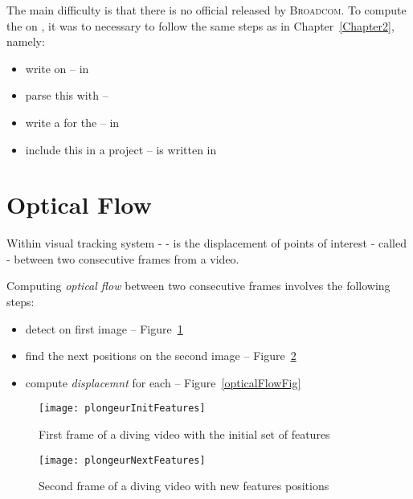 The main difficulty is that there is no official  released by \textsc{Broadcom}. To compute the  on \rasp, it was to necessary to follow the same steps as in Chapter~\ref{Chapter2}, namely:
\begin{itemize}
	\item write  on  -- in 
	\item parse this  with  -- 
	\item write a  for the  -- in 
	\item include this  in a  project --  is written in 
\end{itemize}


\section{Optical Flow}

Within \iBubble{} visual tracking system -  -  is the displacement of points of interest - called  - between two consecutive frames from a video.

Computing \emph{optical flow} between two consecutive frames involves the following steps:
\begin{itemize}
	\item detect  on first image -- Figure~\ref{initFeaturesFig}
	\item find the next  positions on the second image -- Figure~\ref{secondFeaturesFig}
	\item compute \emph{displacemnt} for each  -- Figure~\ref{opticalFlowFig}
\end{itemize}


\begin{figure}[!htbp]
	\centering
	\texttt{[image: plongeurInitFeatures]}
	\caption{First frame of a diving video with the initial set of features}
	\label{initFeaturesFig}
\end{figure}
\FloatBarrier



\begin{figure}[!htbp]
	\centering
	\texttt{[image: plongeurNextFeatures]}
	\caption{Second frame of a diving video with new features positions}
	\label{secondFeaturesFig}
\end{figure}
\FloatBarrier



